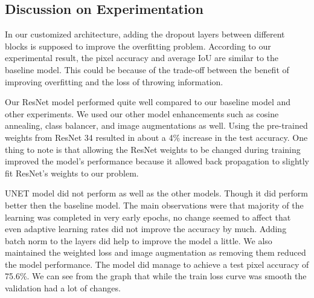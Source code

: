 \documentclass{article}
\begin{document}
\subsection{Discussion on Experimentation}

In our customized architecture, adding the dropout layers between different blocks is supposed to improve the overfitting problem. According to our experimental result, the pixel accuracy and average IoU are similar to the baseline model. This could be because of the trade-off between the benefit of improving overfitting and the loss of throwing information.

Our ResNet model performed quite well compared to our baseline model and other experiments. We used our other model enhancements such as cosine annealing, class balancer, and image augmentations as well. Using the pre-trained weights from ResNet 34 resulted in about a 4\% increase in the test accuracy. One thing to note is that allowing the ResNet weights to be changed during training improved the model's performance because it allowed back propagation to slightly fit ResNet's weights to our problem. 

UNET model did not perform as well as the other models. Though it did perform better then the baseline model. The main observations were that majority of the learning was completed in very early epochs, no change seemed to affect that even adaptive learning rates did not improve the accuracy by much. Adding batch norm to the layers did help to improve the model a little. We also maintained the weighted loss and image augmentation as removing them reduced the model performance. The model did manage to achieve a test pixel accuracy of 75.6\%. We can see from the graph that while the train loss curve was smooth the validation had a lot of changes.



\end{document}
